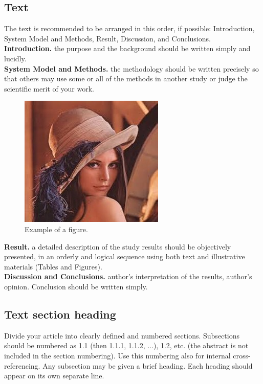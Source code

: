 \documentclass[final,3p,times,twocolumn]{elsarticle}
\begin{document}
\subsection{Text}

The text is recommended to be arranged in this order, if possible: Introduction, System Model and Methods, Result, Discussion, and Conclusions.\\

\textbf{Introduction.} the purpose and the background should be written simply and lucidly. \\

\textbf{System Model and Methods.} the methodology should be written precisely so that others may use some or all of the methods in another study or judge the scientific merit of your work.\\

\begin{figure}
\centering
\includegraphics[width=.8\columnwidth]{fig1.jpg}
\caption{Example of a figure.}
\label{fig:ex}
\end{figure}

\textbf{Result.} a detailed description of the study results should be objectively presented, in an orderly and logical sequence using both text and illustrative materials (Tables and Figures). \\

\textbf{Discussion and Conclusions.} author's interpretation of the results, author's opinion. Conclusion should be written simply.

\subsection{Text section heading}
Divide your article into clearly defined and numbered sections. 
Subsections should be numbered as 1.1 (then 1.1.1, 1.1.2, ...), 1.2, etc. (the abstract is not included in the section numbering). 
Use this numbering also for internal cross-referencing. Any subsection may be given a brief heading. 
Each heading should appear on its own separate line.
\end{document}
